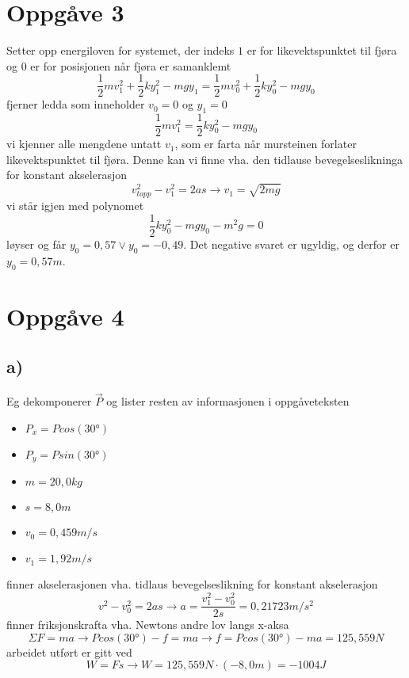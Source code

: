 \documentclass[12pt,a4paper]{article}
\begin{document}
  \section*{Oppgåve 3}
    Setter opp energiloven for systemet, der indeks $1$ er for likevektspunktet til fjøra
    og $0$ er for posisjonen når fjøra er samanklemt
    \begin{equation}
      \frac{1}{2}mv_1^2 + 
      \frac{1}{2}ky_1^2 -
      mgy_1 =
      \frac{1}{2}mv_0^2 +
      \frac{1}{2}ky_0^2 -
      mgy_0
    \end{equation}
    fjerner ledda som inneholder $v_0 = 0$ og $y_1 = 0$
    \begin{equation}
      \frac{1}{2}mv_1^2 =
      \frac{1}{2}ky_0^2 -
      mgy_0
    \end{equation}
    vi kjenner alle mengdene untatt $v_1$, som er farta når mursteinen forlater
    likevektspunktet til fjøra. Denne kan vi finne vha. den tidlause bevegelseslikninga
    for konstant akselerasjon
    \begin{equation}
      v_{topp}^2 - v_1^2 = 2as \rightarrow v_1 = \sqrt{2mg}
    \end{equation}
    vi står igjen med polynomet
    \begin{equation}
      \frac{1}{2}ky_0^2 - mgy_0 - m^2g = 0
    \end{equation}
    løyser og får $y_0 = 0,57 \vee y_0 = -0,49$. Det negative svaret er ugyldig, og
    derfor er $y_0 = 0,57m$.


  \section*{Oppgåve 4}
    \subsection*{a)}
    Eg dekomponerer $\vec{P}$ og lister resten av informasjonen i oppgåveteksten
    \begin{itemize}
      \item $P_x = Pcos(\ang{30})$
      \item $P_y = Psin(\ang{30})$
      \item $m=20,0kg$
      \item $s=8,0m$
      \item $v_0=0,459m/s$
      \item $v_1=1,92m/s$
    \end{itemize}
    finner akselerasjonen vha. tidlaus bevegelseslikning for konstant akselerasjon
    \begin{equation}
      v^2 - v_0^2 = 2as \rightarrow a = \frac{v_1^2 - v_0^2}{2s} = 0,21723 m/s^2
    \end{equation}
    finner friksjonskrafta vha. Newtons andre lov langs x-aksa
    \begin{equation}
      \Sigma F = ma \rightarrow Pcos(\ang{30}) - f = ma
      \rightarrow f = Pcos(\ang{30}) - ma = 125,559N
    \end{equation}
    arbeidet utført er gitt ved
    \begin{equation}
      W=Fs \rightarrow W=125,559N \cdot (-8,0m) = -1004J
    \end{equation}
\end{document}
